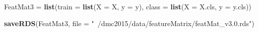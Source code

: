 \documentclass[10pt]{report}
\newenvironment{Shaded}{}{}
\newcommand{\KeywordTok}[1]{\textcolor[rgb]{0.00,0.44,0.13}{\textbf{{#1}}}}
\newcommand{\DataTypeTok}[1]{\textcolor[rgb]{0.56,0.13,0.00}{{#1}}}
\newcommand{\StringTok}[1]{\textcolor[rgb]{0.25,0.44,0.63}{{#1}}}
\newcommand{\NormalTok}[1]{{#1}}
\begin{document}
\begin{Shaded}
\begin{Highlighting}[]
\NormalTok{FeatMat3 =}\StringTok{ }\KeywordTok{list}\NormalTok{(}\DataTypeTok{train =} \KeywordTok{list}\NormalTok{(}\DataTypeTok{X =} \NormalTok{X, }\DataTypeTok{y =} \NormalTok{y), }\DataTypeTok{class =} \KeywordTok{list}\NormalTok{(}\DataTypeTok{X =} \NormalTok{X.cls, }\DataTypeTok{y =} \NormalTok{y.cls))}

\KeywordTok{saveRDS}\NormalTok{(FeatMat3, }\DataTypeTok{file =} \StringTok{"~/dmc2015/data/featureMatrix/featMat_v3.0.rds"}\NormalTok{)}
\end{Highlighting}
\end{Shaded}
\end{document}
